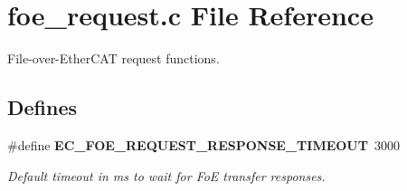 \section{foe\-\_\-request.\-c \-File \-Reference}
\label{foe__request_8c}


\-File-\/over-\/\-Ether\-C\-A\-T request functions.  


\subsection*{\-Defines}
\begin{DoxyCompactItemize}
\item 
\#define {\bf \-E\-C\-\_\-\-F\-O\-E\-\_\-\-R\-E\-Q\-U\-E\-S\-T\-\_\-\-R\-E\-S\-P\-O\-N\-S\-E\-\_\-\-T\-I\-M\-E\-O\-U\-T}~3000\label{foe__request_8c_abb224b1d4a9cdbad17f5e3403e962784}

\begin{DoxyCompactList}\small\item\em \-Default timeout in ms to wait for \-Fo\-E transfer responses. \end{DoxyCompactList}\end{DoxyCompactItemize}
